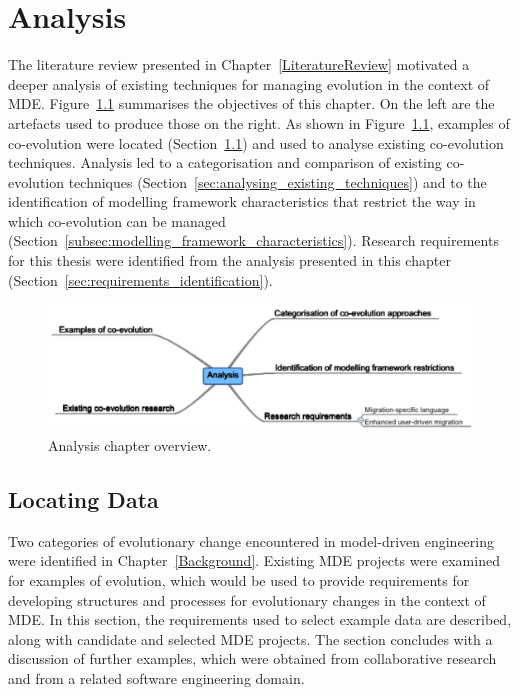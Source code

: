 
\chapter{Analysis}
The literature review presented in Chapter~\ref{LiteratureReview} motivated a deeper analysis of existing techniques for managing evolution in the context of MDE. Figure~\ref{fig:analysis_overview} summarises the objectives of this chapter. On the left are the artefacts used to produce those on the right. As shown in Figure~\ref{fig:analysis_overview}, examples of co-evolution were located (Section~\ref{sec:locating_data}) and used to analyse existing co-evolution techniques. Analysis led to a categorisation and comparison of existing co-evolution techniques (Section~\ref{sec:analysing_existing_techniques}) and to the identification of modelling framework characteristics that restrict the way in which co-evolution can be managed (Section~\ref{subsec:modelling_framework_characteristics}). Research requirements for this thesis were identified from the analysis presented in this chapter (Section~\ref{sec:requirements_identification}).


\begin{figure}[htbp]
  \begin{center}
    \leavevmode
    \includegraphics[scale=0.66]{4.Analysis/overview.pdf}
  \end{center}
  \caption{Analysis chapter overview.}
  \label{fig:analysis_overview}
\end{figure}


\section{Locating Data}
\label{sec:locating_data}
Two categories of evolutionary change encountered in model-driven engineering were identified in Chapter~\ref{Background}. Existing MDE projects were examined for examples of evolution, which would be used to provide requirements for developing structures and processes for evolutionary changes in the context of MDE. In this section, the requirements used to select example data are described, along with candidate and selected MDE projects. The section concludes with a discussion of further examples, which were obtained from collaborative research and from a related software engineering domain.  

